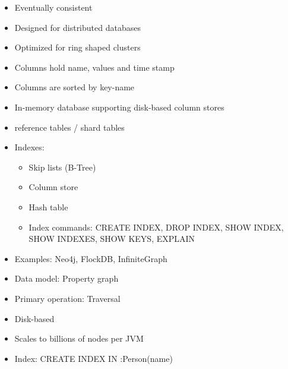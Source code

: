 \begin{breakbox}
\begin{itemize}
	\item Eventually consistent
	\item Designed for distributed databases
	\item Optimized for ring shaped clusters
	\item Columns hold name, values and time stamp
	\item Columns are sorted by key-name
\end{itemize}
\end{breakbox}

\begin{breakbox}
\begin{itemize}
	\item In-memory database supporting disk-based column stores
	\item reference tables / shard tables
	\item Indexes:
		\begin{itemize}
			\item Skip lists (B-Tree)
			\item Column store
			\item Hash table
			\item Index commands: CREATE INDEX, DROP INDEX, SHOW INDEX, SHOW INDEXES, SHOW KEYS, EXPLAIN
		\end{itemize}
\end{itemize}
\end{breakbox}

\begin{breakbox}
\begin{itemize}
	\item Examples: Neo4j, FlockDB, InfiniteGraph
\end{itemize}
\end{breakbox}

\begin{breakbox}
\begin{itemize}
	\item Data model: Property graph
	\item Primary operation: Traversal
	\item Disk-based
	\item Scales to billions of nodes per JVM
	\item Index: CREATE INDEX IN :Person(name)
\end{itemize}
\end{breakbox}

